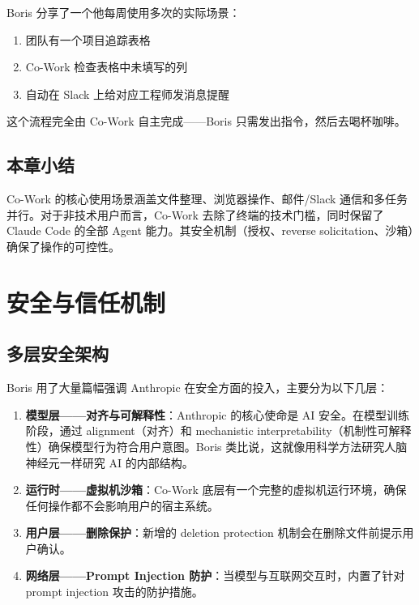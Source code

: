 \documentclass[a4paper]{article}
\begin{document}
Boris 分享了一个他每周使用多次的实际场景：

\begin{enumerate}
    \item 团队有一个项目追踪表格
    \item Co-Work 检查表格中未填写的列
    \item 自动在 Slack 上给对应工程师发消息提醒
\end{enumerate}

这个流程完全由 Co-Work 自主完成——Boris 只需发出指令，然后去喝杯咖啡。

\subsection{本章小结}

Co-Work 的核心使用场景涵盖文件整理、浏览器操作、邮件/Slack 通信和多任务并行。对于非技术用户而言，Co-Work 去除了终端的技术门槛，同时保留了 Claude Code 的全部 Agent 能力。其安全机制（授权、reverse solicitation、沙箱）确保了操作的可控性。

\section{安全与信任机制}

\subsection{多层安全架构}

Boris 用了大量篇幅强调 Anthropic 在安全方面的投入，主要分为以下几层：

\begin{enumerate}
    \item \textbf{模型层——对齐与可解释性}：Anthropic 的核心使命是 AI 安全。在模型训练阶段，通过 alignment（对齐）和 mechanistic interpretability（机制性可解释性）确保模型行为符合用户意图。Boris 类比说，这就像用科学方法研究人脑神经元一样研究 AI 的内部结构。

    \item \textbf{运行时——虚拟机沙箱}：Co-Work 底层有一个完整的虚拟机运行环境，确保任何操作都不会影响用户的宿主系统。

    \item \textbf{用户层——删除保护}：新增的 deletion protection 机制会在删除文件前提示用户确认。

    \item \textbf{网络层——Prompt Injection 防护}：当模型与互联网交互时，内置了针对 prompt injection 攻击的防护措施。
\end{enumerate}
\end{document}
